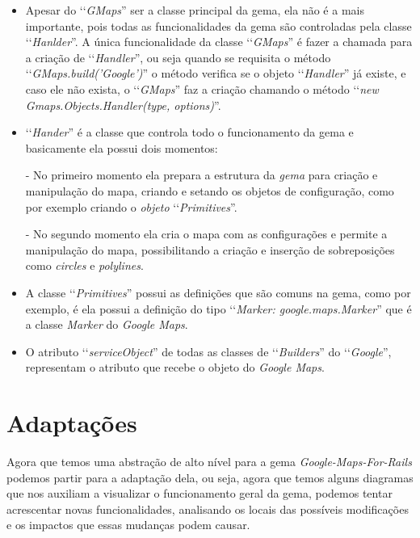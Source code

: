 \begin{itemize}

 \item Apesar do ‘‘\emph{GMaps}'' ser a classe principal da gema, ela não é a mais
 importante, pois todas as funcionalidades da gema são controladas pela classe
 ‘‘\emph{Hanlder}''. A única funcionalidade da classe ‘‘\emph{GMaps}'' é fazer a chamada
 para a criação de ‘‘\emph{Handler}'', ou seja quando se requisita o método 
 ‘‘\emph{GMaps.build('Google')}'' o método verifica se o objeto ‘‘\emph{Handler}'' já
 existe, e caso ele não exista, o ‘‘\emph{GMaps}'' faz a criação chamando o método 
 ‘‘\emph{new Gmaps.Objects.Handler(type, options)}''.

 \item ‘‘\emph{Hander}'' é a classe que controla todo o funcionamento da gema e 
 basicamente ela possui dois momentos:
 
  \subitem - No primeiro momento ela prepara a estrutura da \emph{gema} para criação e manipulação
  do mapa, criando e setando os objetos de configuração, como por exemplo criando o \emph{objeto}
  ‘‘\emph{Primitives}''.
  
  \subitem - No segundo momento ela cria o mapa com as configurações e permite a manipulação do mapa, 
  possibilitando a criação e inserção de sobreposições como \emph{circles} e \emph{polylines}.
 
 \item A classe ‘‘\emph{Primitives}'' possui as definições que são comuns na gema, 
 como por exemplo, é ela possui a definição do tipo ‘‘\emph{Marker: google.maps.Marker}'' que 
 é a classe \emph{Marker} do \emph{Google Maps}.
 
 \item O atributo ‘‘\emph{serviceObject}'' de todas as classes de 
 ‘‘\emph{Builders}'' do ‘‘\emph{Google}'', representam o atributo que recebe o objeto do 
 \emph{Google Maps}.
 
\end{itemize}
 
\section{Adaptações}
\label{section:adaptações}

Agora que temos uma abstração de alto nível para a gema \emph{Google-Maps-For-Rails} podemos partir para a 
adaptação dela, ou seja, agora que temos alguns diagramas que nos auxiliam a visualizar o funcionamento 
geral da gema, podemos tentar acrescentar novas funcionalidades, analisando os locais das possíveis 
modificações e os impactos que essas mudanças podem causar. 

